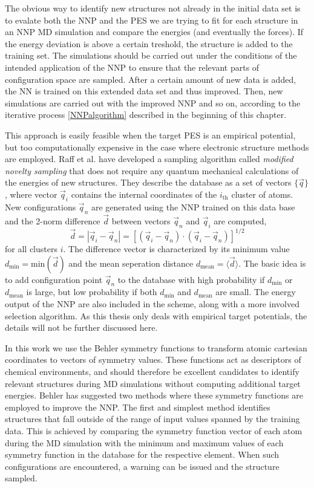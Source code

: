 \documentclass[twoside,english]{uiofysmaster}
\begin{document}
The obvious way to identify new structures not already in the initial data set is to evalate both the NNP and 
the PES we are trying to fit for each structure in an NNP MD simulation and compare the energies (and eventually 
the forces). If the energy deviation is above a certain treshold, the structure is added to the training set.
The simulations should be carried out under the conditions of the intended application of the NNP to ensure
that the relevant parts of configuration space are sampled.
After a certain amount of new data is added, 
the NN is trained on this extended data set and thus improved. Then, new simulations are carried out with the improved
NNP and so on, according to the iterative process \autoref{NNPalgorithm} described in the beginning of this chapter. 

This approach is easily feasible when the target PES is an empirical potential, but too computationally expensive 
in the case where electronic structure methods are employed. Raff et al. \cite{Raff05} have developed a sampling
algorithm called \textit{modified novelty sampling} that does not require any quantum mechanical calculations of
the energies of new structures. They describe the database as a set of vectors $\{\vec{q}\}$, where vector
$\vec{q}_i$ contains the internal coordinates of the $i_\textrm{th}$ cluster of atoms. New configurations
$\vec{q}_n$ are generated using the NNP trained on this data base and the 2-norm difference $\vec{d}$ between vectors
$\vec{q}_n$ and $\vec{q}_i$ are computed,
\begin{equation}
 \vec{d} = | \vec{q}_i - \vec{q}_n | = 
 \left[(\vec{q}_i - \vec{q}_n)\cdot(\vec{q}_i - \vec{q}_n)\right]^{1/2}
\end{equation}
for all clusters $i$. The difference vector is characterized by its minimum value $d_\textrm{min} = \textrm{min}(\vec{d})$ and 
the mean seperation distance $d_\textrm{mean} = \langle\vec{d}\rangle$. 
The basic idea is to add configuration point $\vec{q}_n$ to the database with high
probability if $d_\textrm{min}$ or $d_\textrm{mean}$ is large, but low probability if both 
$d_\textrm{min}$ and $d_\textrm{mean}$ are small. The energy output of the NNP are also included in the scheme, along with
a more involved selection algorithm. As this thesis only deals with empirical target potentials, the details will
not be further discussed here. 

In this work we use the Behler symmetry functions to transform atomic cartesian coordinates to vectors of symmetry values.
These functions act as descriptors of chemical environments, and should therefore be excellent candidates
to identify relevant structures during MD simulations without computing additional target energies. 
Behler has suggested two methods \cite{Behler11general} where these symmetry functions are employed to improve the NNP. 
The first and simplest method identifies structures that fall outside of the range of input values spanned by the training data. 
This is achieved by comparing the symmetry function vector of each atom during the MD simulation with 
the minimum and maximum values of each symmetry function in the database for the respective element. 
When such configurations are encountered, a warning can be issued and the structure sampled.  
\end{document}
